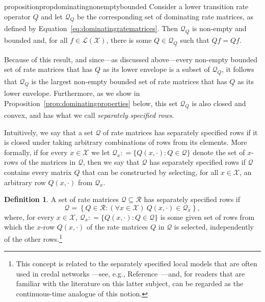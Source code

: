 \documentclass[10pt,a4paper]{paper}
\theoremstyle{definition}
\newtheorem{definition}{Definition}
\newcommand{\states}{\mathcal{X}}
\newcommand{\gambles}{\mathcal{L}}
\newcommand{\gamblesX}{\gambles(\states)}
\newcommand{\rateset}{\mathcal{Q}}
\newcommand{\lrate}{\underline{Q}}
\newcommand{\coloneqq}{:\!=}
\begin{document}
\begin{restatable}{proposition}{propdominatingnonemptybounded}
\label{prop:dominating_nonempty_bounded}
Consider a lower transition rate operator $\lrate$ and let $\rateset_{\lrate}$ be the corresponding set of dominating rate matrices, as defined by Equation~\eqref{eq:dominatingratematrices}. Then $\rateset_{\lrate}$ is non-empty and bounded and, for all $f\in\gamblesX$, there is some $Q\in\rateset_{\lrate}$ such that $\lrate f=Qf$.
\end{restatable}

\noindent
Because of this result, and since---as discussed above---every non-empty bounded set of rate matrices that has $\lrate$ as its lower envelope is a subset of $\rateset_{\lrate}$, it follows that $\rateset_{\lrate}$ is the largest non-empty bounded set of rate matrices that has $\lrate$ as its lower envelope.
Furthermore, as we show in Proposition~\ref{prop:dominatingproperties} below, this set $\rateset_{\lrate}$ is also closed and convex, and has what we call \emph{separately specified rows}. 

Intuitively, we say that a set $\rateset$ of rate matrices has separately specified rows if it is closed under taking arbitrary combinations of rows from its elements. More formally, if for every $x\in\states$ we let $\rateset_x\coloneqq\{Q(x,\cdot):Q\in\rateset\}$ denote the set of $x$-rows of the matrices in $\rateset$, then we say that $\rateset$ has separately specified rows if $\rateset$ contains every matrix $Q$ that can be constructed by selecting, for all $x\in\states$, an arbitrary row $Q(x,\cdot)$ from $\rateset_x$.

\begin{definition}\label{def:separatelyspecifiedrows}
A set of rate matrices $\rateset\subseteq\mathcal{R}$ has separately specified rows if
\begin{equation*}
\rateset=\left\{
Q\in\mathcal{R}
\colon
(\forall x\in\states)~Q(x,\cdot)\in\rateset_x\right\},
\end{equation*}
where, for every $x\in\states$, $\rateset_x\coloneqq\{Q(x,\cdot)\colon Q\in\rateset\}$ is some given set of rows from which the $x$-row $Q(x,\cdot)$ of the rate matrices $Q$ in $\rateset$ is selected, independently of the other rows.\footnote{This concept is related to the separately specified local models that are often used in credal networks ---see, e.g., Reference~\cite{daRocha:2002uf}---and, for readers that are familiar with the literature on this latter subject, can be regarded as the continuous-time analogue of this notion.}
\end{definition}
\end{document}
